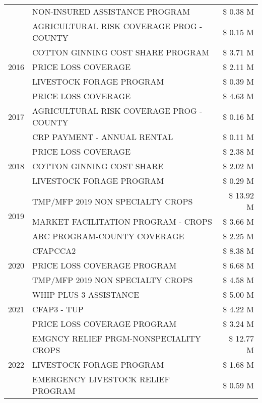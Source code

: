 \begin{tabular}{llr}
 & NON-INSURED ASSISTANCE PROGRAM & \$ 0.38 M \\
 & AGRICULTURAL RISK COVERAGE PROG - COUNTY & \$ 0.15 M \\
\cline{1-3}
\multirow[t]{3}{*}{2016} & COTTON GINNING COST SHARE PROGRAM & \$ 3.71 M \\
 & PRICE LOSS COVERAGE & \$ 2.11 M \\
 & LIVESTOCK FORAGE PROGRAM & \$ 0.39 M \\
\cline{1-3}
\multirow[t]{3}{*}{2017} & PRICE LOSS COVERAGE & \$ 4.63 M \\
 & AGRICULTURAL RISK COVERAGE PROG - COUNTY & \$ 0.16 M \\
 & CRP PAYMENT - ANNUAL RENTAL & \$ 0.11 M \\
\cline{1-3}
\multirow[t]{3}{*}{2018} & PRICE LOSS COVERAGE & \$ 2.38 M \\
 & COTTON GINNING COST SHARE & \$ 2.02 M \\
 & LIVESTOCK FORAGE PROGRAM & \$ 0.29 M \\
\cline{1-3}
\multirow[t]{3}{*}{2019} & TMP/MFP 2019 NON SPECIALTY CROPS & \$ 13.92 M \\
 & MARKET FACILITATION PROGRAM - CROPS & \$ 3.66 M \\
 & ARC PROGRAM-COUNTY COVERAGE & \$ 2.25 M \\
\cline{1-3}
\multirow[t]{3}{*}{2020} & CFAPCCA2 & \$ 8.38 M \\
 & PRICE LOSS COVERAGE PROGRAM & \$ 6.68 M \\
 & TMP/MFP 2019 NON SPECIALTY CROPS & \$ 4.58 M \\
\cline{1-3}
\multirow[t]{3}{*}{2021} & WHIP PLUS 3 ASSISTANCE & \$ 5.00 M \\
 & CFAP3 - TUP & \$ 4.22 M \\
 & PRICE LOSS COVERAGE PROGRAM & \$ 3.24 M \\
\cline{1-3}
\multirow[t]{3}{*}{2022} & EMGNCY RELIEF PRGM-NONSPECIALITY CROPS & \$ 12.77 M \\
 & LIVESTOCK FORAGE PROGRAM & \$ 1.68 M \\
 & EMERGENCY LIVESTOCK RELIEF PROGRAM & \$ 0.59 M \\
\cline{1-3}
\bottomrule
\end{tabular}
